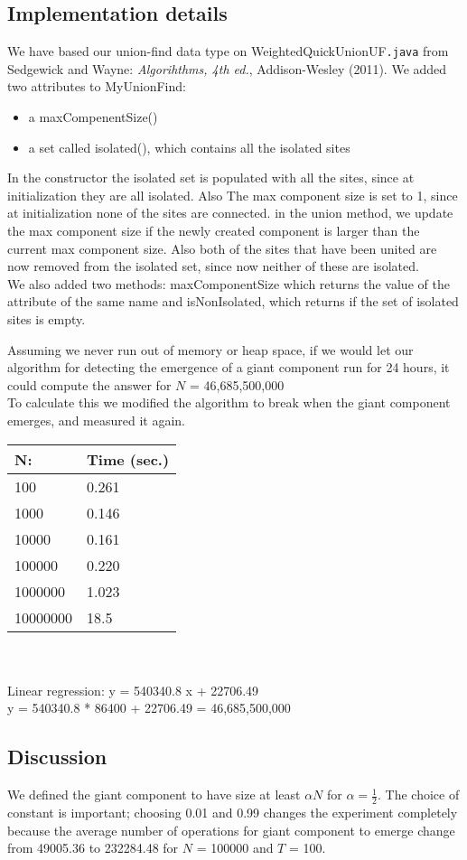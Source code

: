 \documentclass{tufte-handout}
\begin{document}
\subsection{Implementation details}

We have based our union-find data type on {WeightedQuickUnionUF\tt .java} from Sedgewick and Wayne: {\em Algorihthms, 4th ed.}, Addison-Wesley (2011). We added two attributes to MyUnionFind:
\begin{itemize}
\item a maxCompenentSize()
\item a set called isolated(), which contains all the isolated sites
\end{itemize}
In the constructor the isolated set is populated with all the sites, since at initialization they are all isolated. Also The max component size is set to 1, since at initialization none of the sites are connected.
in the union method, we update the max component size if the newly created component is larger than the current max component size.
Also both of the sites that have been united are now removed from the isolated set, since now neither of these are isolated. \\
We also added two methods: maxComponentSize which returns the value of the attribute of the same name and isNonIsolated, which returns if the set of isolated sites is empty.

Assuming we never run out of memory or heap space, if we would let our algorithm for detecting the emergence of a giant component run for 24 hours, it could compute the answer for $N$ = 46,685,500,000 \\

To calculate this we modified the algorithm to break when the giant component emerges, and measured it again. \\

\begin{tabular}{ll}
  \toprule
  N: & Time (sec.) \\
  \midrule
  100 & 0.261 \\
  1000 & 0.146 \\
  10000 & 0.161 \\
  100000 & 0.220 \\
  1000000 & 1.023 \\
  10000000 & 18.5 \\
  \bottomrule
\end{tabular}\\ \\

Linear regression: y = 540340.8 x + 22706.49 \\

		y = 540340.8 * 86400 + 22706.49 = 46,685,500,000 

\subsection{Discussion}

We defined the giant component to have size at least $\alpha N$ for $\alpha = \frac{1}{2}$. The choice of constant is important; choosing 0.01 and 0.99 changes the experiment completely because
the average number of operations for giant component to emerge change from 49005.36 to 232284.48 for  $N$ = 100000 and  $T$ = 100. 
\end{document}
